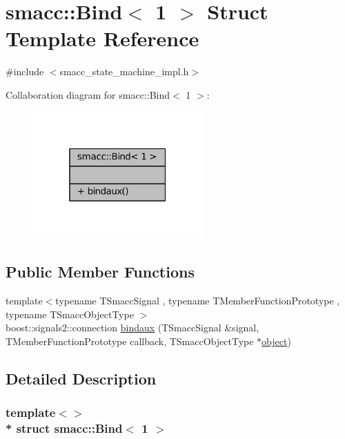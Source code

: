 \hypertarget{structsmacc_1_1Bind_3_011_01_4}{}\section{smacc\+:\+:Bind$<$ 1 $>$ Struct Template Reference}
\label{structsmacc_1_1Bind_3_011_01_4}


{\ttfamily \#include $<$smacc\+\_\+state\+\_\+machine\+\_\+impl.\+h$>$}



Collaboration diagram for smacc\+:\+:Bind$<$ 1 $>$\+:
\nopagebreak
\begin{figure}[H]
\begin{center}
\leavevmode
\includegraphics[width=184pt]{structsmacc_1_1Bind_3_011_01_4__coll__graph}
\end{center}
\end{figure}
\subsection*{Public Member Functions}
\begin{DoxyCompactItemize}
\item 
{\footnotesize template$<$typename T\+Smacc\+Signal , typename T\+Member\+Function\+Prototype , typename T\+Smacc\+Object\+Type $>$ }\\boost\+::signals2\+::connection \hyperlink{structsmacc_1_1Bind_3_011_01_4_ab1ef45ad9d56f707284a5fcb166646ee}{bindaux} (T\+Smacc\+Signal \&signal, T\+Member\+Function\+Prototype callback, T\+Smacc\+Object\+Type $\ast$\hyperlink{classobject}{object})
\end{DoxyCompactItemize}


\subsection{Detailed Description}
\subsubsection*{template$<$$>$\\*
struct smacc\+::\+Bind$<$ 1 $>$}



